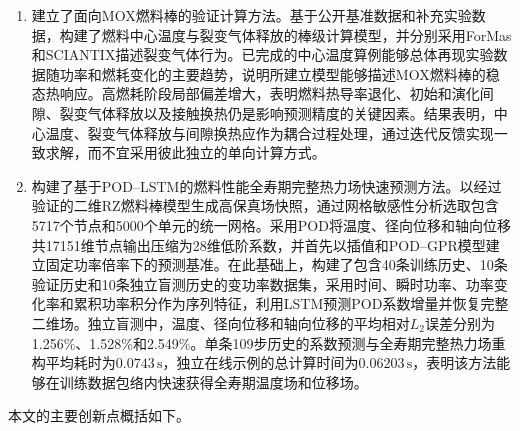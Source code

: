 \begin{enumerate}[label={（\arabic*）},leftmargin=2.8em]
	\item 建立了面向MOX燃料棒的验证计算方法。基于公开基准数据和补充实验数据，构建了燃料中心温度与裂变气体释放的棒级计算模型，并分别采用ForMas和SCIANTIX描述裂变气体行为。已完成的中心温度算例能够总体再现实验数据随功率和燃耗变化的主要趋势，说明所建立模型能够描述MOX燃料棒的稳态热响应。高燃耗阶段局部偏差增大，表明燃料热导率退化、初始和演化间隙、裂变气体释放以及接触换热仍是影响预测精度的关键因素。结果表明，中心温度、裂变气体释放与间隙换热应作为耦合过程处理，通过迭代反馈实现一致求解，而不宜采用彼此独立的单向计算方式。

	\item 构建了基于POD--LSTM的燃料性能全寿期完整热力场快速预测方法。以经过验证的二维RZ燃料棒模型生成高保真场快照，通过网格敏感性分析选取包含5717个节点和5000个单元的统一网格。采用POD将温度、径向位移和轴向位移共17151维节点输出压缩为28维低阶系数，并首先以插值和POD--GPR模型建立固定功率倍率下的预测基准。在此基础上，构建了包含40条训练历史、10条验证历史和10条独立盲测历史的变功率数据集，采用时间、瞬时功率、功率变化率和累积功率积分作为序列特征，利用LSTM预测POD系数增量并恢复完整二维场。独立盲测中，温度、径向位移和轴向位移的平均相对$L_2$误差分别为1.256\%、1.528\%和2.549\%。单条109步历史的系数预测与全寿期完整热力场重构平均耗时为$0.0743\,\mathrm{s}$，独立在线示例的总计算时间为$0.06203\,\mathrm{s}$，表明该方法能够在训练数据包络内快速获得全寿期温度场和位移场。
\end{enumerate}


本文的主要创新点概括如下。

